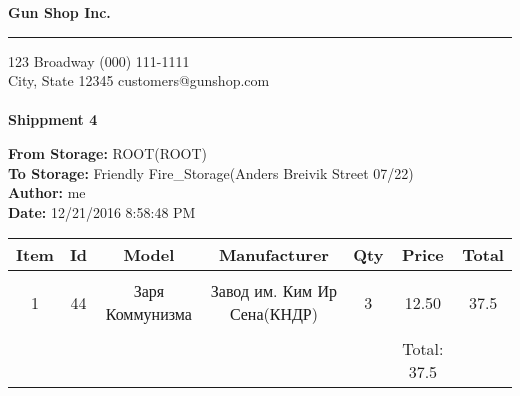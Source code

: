 \documentclass{article}
\begin{document}
\hfil{\Huge\bf Gun Shop Inc.}\hfil
\bigskip
\hrule
\bigskip

123 Broadway \hfill (000) 111-1111 \\
City, State 12345 \hfill customers@gunshop.com\\ \\

\hfill{\bf Shippment 4}\hfill
\bigskip

{\bf From Storage:}   ROOT(ROOT)\\
{\bf To Storage:}  Friendly Fire\_Storage(Anders Breivik Street 07/22) \\
{\bf Author:}  me \\ 
{\bf Date:}  12/21/2016 8:58:48 PM \\
\begin{center}
\begin{tabular}{ c c c c c c c }
  Item & Id & Model & Manufacturer & Qty & Price & Total  \\[2ex]
\hline\\
 1 & 44 & Заря Коммунизма& Завод им. Ким Ир Сена(КНДР)& 3 & 12.50 & 37.5 \\ [2ex]\hline\\&&&&&Total: 37.5&\end{tabular}\end{center}
\end{document}
